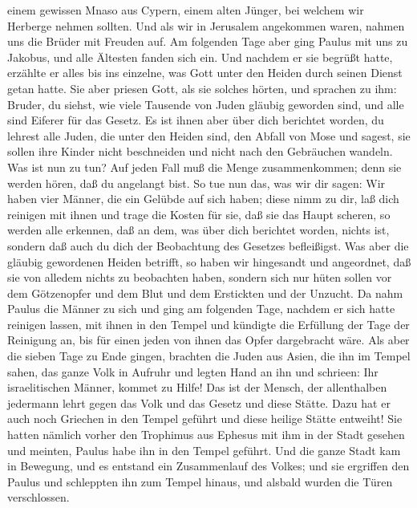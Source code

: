 einem gewissen Mnaso aus Cypern, einem alten Jünger, bei welchem wir
Herberge nehmen sollten.  Und als wir in Jerusalem
angekommen waren, nahmen uns die Brüder mit Freuden auf. 
Am folgenden Tage aber ging Paulus mit uns zu Jakobus, und alle Ältesten
fanden sich ein.  Und nachdem er sie begrüßt hatte,
erzählte er alles bis ins einzelne, was Gott unter den Heiden durch
seinen Dienst getan hatte.  Sie aber priesen Gott, als
sie solches hörten, und sprachen zu ihm: Bruder, du siehst, wie viele
Tausende von Juden gläubig geworden sind, und alle sind Eiferer für das
Gesetz.  Es ist ihnen aber über dich berichtet worden, du
lehrest alle Juden, die unter den Heiden sind, den Abfall von Mose und
sagest, sie sollen ihre Kinder nicht beschneiden und nicht nach den
Gebräuchen wandeln.  Was ist nun zu tun? Auf jeden Fall
muß die Menge zusammenkommen; denn sie werden hören, daß du angelangt
bist.  So tue nun das, was wir dir sagen: Wir haben vier
Männer, die ein Gelübde auf sich haben;  diese nimm zu
dir, laß dich reinigen mit ihnen und trage die Kosten für sie, daß sie
das Haupt scheren, so werden alle erkennen, daß an dem, was über dich
berichtet worden, nichts ist, sondern daß auch du dich der Beobachtung
des Gesetzes befleißigst.  Was aber die gläubig
gewordenen Heiden betrifft, so haben wir hingesandt und angeordnet, daß
sie von alledem nichts zu beobachten haben, sondern sich nur hüten
sollen vor dem Götzenopfer und dem Blut und dem Erstickten und der
Unzucht.  Da nahm Paulus die Männer zu sich und ging am
folgenden Tage, nachdem er sich hatte reinigen lassen, mit ihnen in den
Tempel und kündigte die Erfüllung der Tage der Reinigung an, bis für
einen jeden von ihnen das Opfer dargebracht wäre.  Als
aber die sieben Tage zu Ende gingen, brachten die Juden aus Asien, die
ihn im Tempel sahen, das ganze Volk in Aufruhr und legten Hand an ihn
und schrieen:  Ihr israelitischen Männer, kommet zu
Hilfe! Das ist der Mensch, der allenthalben jedermann lehrt gegen das
Volk und das Gesetz und diese Stätte. Dazu hat er auch noch Griechen in
den Tempel geführt und diese heilige Stätte entweiht! 
Sie hatten nämlich vorher den Trophimus aus Ephesus mit ihm in der Stadt
gesehen und meinten, Paulus habe ihn in den Tempel geführt.
 Und die ganze Stadt kam in Bewegung, und es entstand ein
Zusammenlauf des Volkes; und sie ergriffen den Paulus und schleppten ihn
zum Tempel hinaus, und alsbald wurden die Türen verschlossen.
